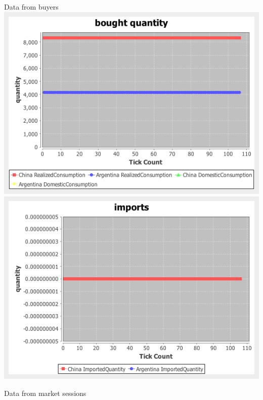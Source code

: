 \documentclass{article}
\begin{document}
\noindent Data from buyers
\vskip2mm
\hskip-2cm
\includegraphics[scale=0.4]{fig_case3_qs}
\includegraphics[scale=0.4]{fig_case3_imports}

\noindent Data from market sessions
\end{document}
